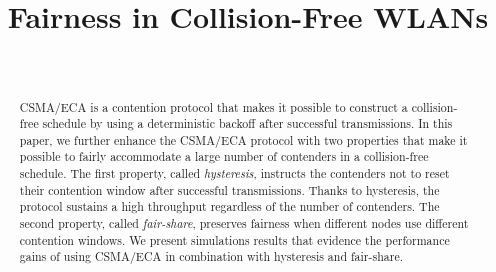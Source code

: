 \documentclass[conference]{IEEEtran}
\begin{document}
 \title{Fairness in Collision-Free WLANs}


  \author{
      \\
  }



\maketitle

\begin{abstract}

\boldmath CSMA/ECA is a contention protocol that makes it possible to construct a collision-free schedule by using a deterministic backoff after successful transmissions. In this paper, we further enhance the CSMA/ECA protocol with two properties that make it possible to fairly accommodate a large number of contenders in a collision-free schedule. The first property, called \emph{hysteresis}, instructs the contenders not to reset their contention window after successful transmissions. Thanks to hysteresis, the protocol sustains a high throughput regardless of the number of contenders. The second property, called \emph{fair-share}, preserves fairness when different nodes use different contention windows. We present simulations results that evidence the performance gains of using CSMA/ECA in combination with hysteresis and fair-share.

\end{abstract}
\end{document}
